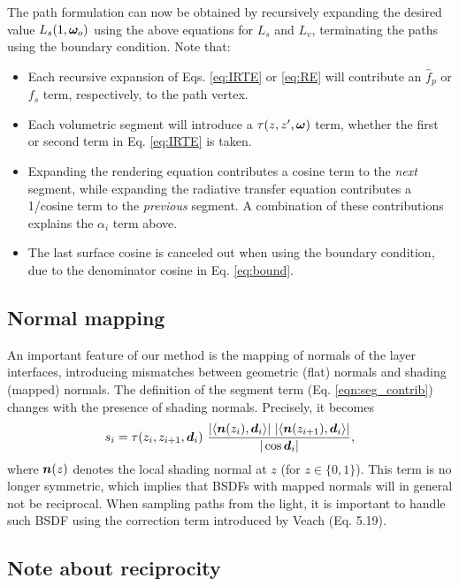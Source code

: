 The path formulation can now be obtained by recursively expanding the desired value $L_s(1, \bm{\omega}_o)$ using the above equations for $L_s$ and $L_v$, terminating the paths using the boundary condition. Note that:
\begin{itemize}
	\item Each recursive expansion of Eqs. \eqref{eq:IRTE} or \eqref{eq:RE} will contribute an $\hat f_p$ or $f_s$ term, respectively, to the path vertex.
	\item Each volumetric segment will introduce a $\tau(z, z', \bm{\omega})$ term, whether the first or second term in Eq. \eqref{eq:IRTE} is taken.
	\item{Expanding the rendering equation contributes a cosine term to the \emph{next} segment, while expanding the radiative transfer equation contributes a 1/cosine term to the \emph{previous} segment. A combination of these contributions explains the $\alpha_i$ term above.}
	\item The last surface cosine is canceled out when using the boundary condition, due to the denominator cosine in Eq. \eqref{eq:bound}.
\end{itemize}


\subsection{Normal mapping}

An important feature of our method is the mapping of normals of the layer interfaces, introducing mismatches between geometric (flat) normals and shading (mapped) normals. The definition of the segment term (Eq. \eqref{eqn:seg_contrib}) changes with the presence of shading normals. Precisely, it becomes
\begin{equation}
s_i = \tau(z_i, z_{i+1}, \bm{d}_i) \ \frac{|\langle \bm{n}(z_i), \bm{d}_i \rangle| \ |\langle \bm{n}(z_{i + 1}), \bm{d}_i \rangle|}{|\cos \bm{d}_i|},
\end{equation}
where $\bm{n}(z)$ denotes the local shading normal at $z$ (for $z \in \{0, 1\}$). This term is no longer symmetric, which implies that BSDFs with mapped normals will in general not be reciprocal. When sampling paths from the light, it is important to handle such BSDF using the correction term introduced by Veach \cite{veach1997robust} (Eq. 5.19).


\subsection{Note about reciprocity}

